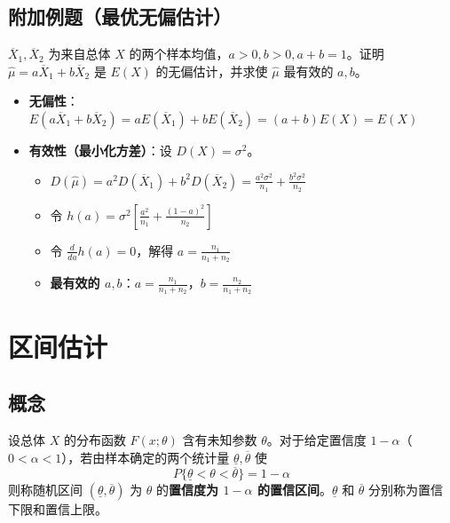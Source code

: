 \subsection{附加例题（最优无偏估计）}
\begin{example}[最优无偏估计]
$\overline{X}_1, \overline{X}_2$ 为来自总体 $X$ 的两个样本均值，$a>0, b>0, a+b=1$。证明 $\hat{\mu} = a\overline{X}_1 + b\overline{X}_2$ 是 $E(X)$ 的无偏估计，并求使 $\hat{\mu}$ 最有效的 $a, b$。
\end{example}
\begin{solution}
\begin{itemize}
	\item \textbf{无偏性}：$E(a\overline{X}_1 + b\overline{X}_2) = aE(\overline{X}_1) + bE(\overline{X}_2) = (a+b)E(X) = E(X)$
	\item \textbf{有效性（最小化方差）}：设 $D(X)=\sigma^2$。
	\begin{itemize}
		\item $D(\hat{\mu}) = a^2D(\overline{X}_1) + b^2D(\overline{X}_2) = \frac{a^2\sigma^2}{n_1} + \frac{b^2\sigma^2}{n_2}$
		\item 令 $h(a) = \sigma^2 \left[\frac{a^2}{n_1} + \frac{(1-a)^2}{n_2}\right]$
		\item 令 $\frac{d}{da}h(a) = 0$，解得 $a = \frac{n_1}{n_1 + n_2}$
		\item \textbf{最有效的 $a, b$}：$a = \frac{n_1}{n_1 + n_2}$，$b = \frac{n_2}{n_1 + n_2}$
	\end{itemize}
\end{itemize}
\end{solution}

\section{区间估计}
\subsection{概念}
\begin{definition}[置信区间]
设总体 $X$ 的分布函数 $F(x;\theta)$ 含有未知参数 $\theta$。对于给定置信度 $1-\alpha$（$0 < \alpha < 1$），若由样本确定的两个统计量 $\underline{\theta}, \overline{\theta}$ 使
\begin{equation}
	P\{\underline{\theta} < \theta < \overline{\theta}\} = 1-\alpha
	\label{eq:区间估计:定义}
\end{equation}
则称随机区间 $(\underline{\theta}, \overline{\theta})$ 为 $\theta$ 的\textbf{置信度为 $1-\alpha$ 的置信区间}。$\underline{\theta}$ 和 $\overline{\theta}$ 分别称为置信下限和置信上限。
\end{definition}

